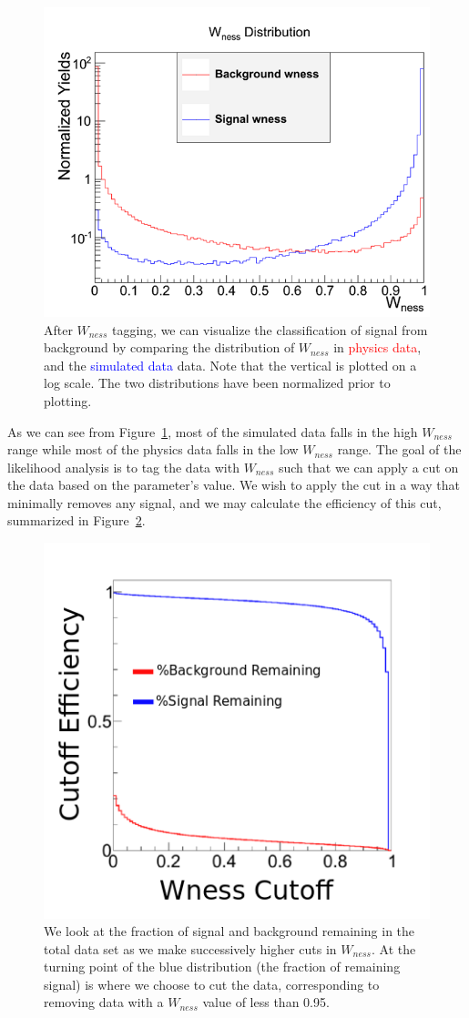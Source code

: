 \begin{figure}
  \centering
  \includegraphics[width=0.7\linewidth]{./figures/wness_sig_bak.png}
  \caption{
    After $W_{ness}$ tagging, we can visualize the classification of signal from
    background by comparing the distribution of $W_{ness}$ in
    \textcolor{red}{physics data}, and the \textcolor{blue}{simulated data}
    data. Note that the vertical is plotted on a log scale. The two
    distributions have been normalized prior to plotting.
  }
  \label{fig:wness_distribution}
\end{figure}

As we can see from Figure~\ref{fig:wness_distribution}, most of the simulated
data falls in the high $W_{ness}$ range while most of the physics data falls in
the low $W_{ness}$ range. The goal of the likelihood analysis is to tag the data
with $W_{ness}$ such that we can apply a cut on the data based on the
parameter's value. We wish to apply the cut in a way that minimally removes any
signal, and we may calculate the efficiency of this cut, summarized in
Figure~\ref{fig:wness_cut_efficiency}.

\begin{figure}
  \centering
  \includegraphics[width=0.7\linewidth]{./figures/wness_cut_efficiency.png}
  \caption{
    We look at the fraction of signal and background remaining in the total data
    set as we make successively higher cuts in $W_{ness}$. At the turning point
    of the blue distribution (the fraction of remaining signal) is where we
    choose to cut the data, corresponding to removing data with a $W_{ness}$
    value of less than 0.95.
  }
  \label{fig:wness_cut_efficiency}
\end{figure}

